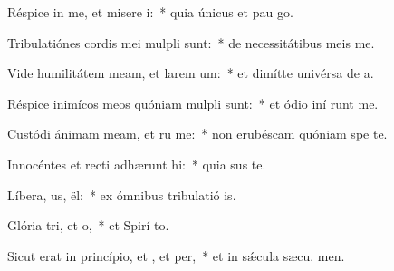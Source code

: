 \item Réspice in me, et misere i:~* quia únicus et pau  go.
\item Tribulatiónes cordis mei mulpli sunt:~* de necessitátibus meis  me.
\item Vide humilitátem meam, et larem um:~* et dimítte univérsa de a.
\item Réspice inimícos meos quóniam mulpli sunt:~* et ódio iní runt me.
\item Custódi ánimam meam, et ru me:~* non erubéscam quóniam spe  te.
\item Innocéntes et recti adhærunt hi:~* quia sus te.
\item Líbera, us, ël:~* ex ómnibus tribulatió is.
\item Glória tri, et o,~* et Spirí to.
\item Sicut erat in princípio, et , et per,~* et in sǽcula sæcu. men.
